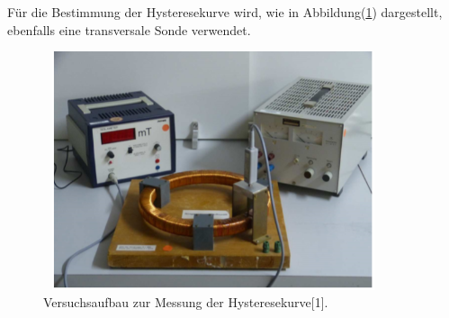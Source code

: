 Für die Bestimmung der Hysteresekurve wird, wie in Abbildung(\ref{abb:6}) dargestellt,
ebenfalls eine transversale Sonde verwendet.
\begin{figure}[H]
  \centering
  \includegraphics[width=10cm, height= 7cm]{Abb6.png}
  \caption{Versuchsaufbau zur Messung der Hysteresekurve[1].}
  \label{abb:6}
\end{figure}

